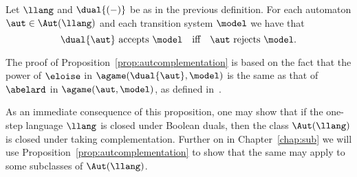 \begin{proposition}
\label{prop:autcomplementation}
Let $\llang$ and $\dual{(-)}$ be as in the previous definition.
For each automaton $\aut \in \Aut(\llang)$ and each transition system
$\model$ we have that
\[
\dual{\aut} \text{ accepts } \model
\quad\text{iff}\quad
\aut \text{ rejects } \model.
\]
\end{proposition}

The proof of Proposition~\ref{prop:autcomplementation} is based on the fact
that the power of $\eloise$ in $\agame(\dual{\aut},\model)$ is the same
as that of $\abelard$ in $\agame(\aut,\model)$, as defined in~\cite{DBLP:conf/calco/KissigV09}.

As an immediate consequence of this proposition, one may show that if the
one-step language $\llang$ is closed under Boolean duals, then the class
$\Aut(\llang)$ is closed under taking complementation.
Further on in Chapter~\ref{chap:sub} we will use Proposition~\ref{prop:autcomplementation} to show that
the same may apply to some subclasses of $\Aut(\llang)$.
